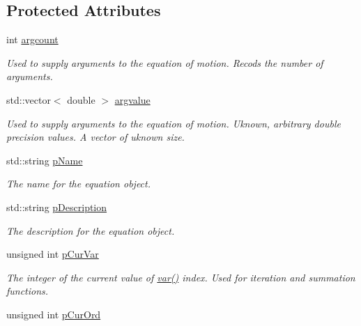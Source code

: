 \subsection*{Protected Attributes}
\begin{DoxyCompactItemize}
\item 
int \hyperlink{classosea_1_1ofreq_1_1_equationof_motion_a13a15811fd575ac0fccf0d463218657b}{argcount}
\begin{DoxyCompactList}\small\item\em Used to supply arguments to the equation of motion. Recods the number of arguments. \end{DoxyCompactList}\item 
std\-::vector$<$ double $>$ \hyperlink{classosea_1_1ofreq_1_1_equationof_motion_a1a9bf7f3460368c102aa8d4edec9b500}{argvalue}
\begin{DoxyCompactList}\small\item\em Used to supply arguments to the equation of motion. Uknown, arbitrary double precision values. A vector of uknown size. \end{DoxyCompactList}\item 
std\-::string \hyperlink{classosea_1_1ofreq_1_1_equationof_motion_a5848a1ad14d31556fd1b62b4e3de3643}{p\-Name}
\begin{DoxyCompactList}\small\item\em The name for the equation object. \end{DoxyCompactList}\item 
std\-::string \hyperlink{classosea_1_1ofreq_1_1_equationof_motion_aa6ce10dacd47441d445a9170bd355792}{p\-Description}
\begin{DoxyCompactList}\small\item\em The description for the equation object. \end{DoxyCompactList}\item 
\hypertarget{classosea_1_1ofreq_1_1_equationof_motion_a88a53c5688c07a1cb90cdf5755782fcf}{unsigned int \hyperlink{classosea_1_1ofreq_1_1_equationof_motion_a88a53c5688c07a1cb90cdf5755782fcf}{p\-Cur\-Var}}\label{classosea_1_1ofreq_1_1_equationof_motion_a88a53c5688c07a1cb90cdf5755782fcf}

\begin{DoxyCompactList}\small\item\em The integer of the current value of \hyperlink{classosea_1_1ofreq_1_1_equationof_motion_ab69511cc5037376cf7da80ce30d9eaab}{var()} index. Used for iteration and summation functions. \end{DoxyCompactList}\item 
\hypertarget{classosea_1_1ofreq_1_1_equationof_motion_a39d41e27dcf84f163ef794a9287a0ef1}{unsigned int \hyperlink{classosea_1_1ofreq_1_1_equationof_motion_a39d41e27dcf84f163ef794a9287a0ef1}{p\-Cur\-Ord}}\label{classosea_1_1ofreq_1_1_equationof_motion_a39d41e27dcf84f163ef794a9287a0ef1}


\end{DoxyCompactItemize}
